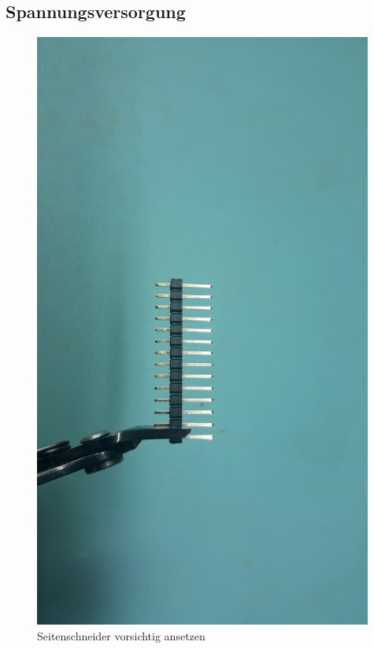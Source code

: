 \documentclass[12pt, a4paper]{article}		%
\begin{document}
\subsection{Spannungsversorgung}

\begin{minipage}[t]{0.49\textwidth}
\begin{figure}[H]
	\centering
		\includegraphics[width=0.99\textwidth]{Grafiken/20200726_121903.jpg}
	\caption{Seitenschneider vorsichtig ansetzen}
	\label{fig:20200726_121444}
\end{figure}
\end{minipage}
\end{document}
